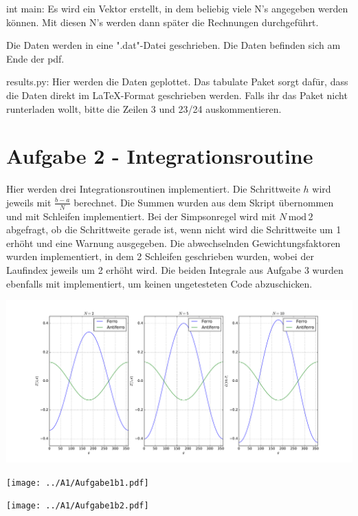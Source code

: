 int main:
Es wird ein Vektor erstellt, in dem beliebig viele N's angegeben werden können.
Mit diesen N's werden dann später die Rechnungen durchgeführt.

Die Daten werden in eine ".dat"-Datei geschrieben.
Die Daten befinden sich am Ende der pdf.

results.py:
Hier werden die Daten geplottet.
Das tabulate Paket sorgt dafür, dass die Daten direkt im LaTeX-Format geschrieben werden.
Falls ihr das Paket nicht runterladen wollt, bitte die Zeilen 3 und 23/24 auskommentieren.


\section{Aufgabe 2 - Integrationsroutine}
Hier werden drei Integrationsroutinen implementiert.
Die Schrittweite $h$ wird jeweils mit $\frac{b-a}{N}$ berechnet.
Die Summen wurden aus dem Skript übernommen und mit Schleifen implementiert.
Bei der Simpsonregel wird mit $N\,\text{mod}\,2$ abgefragt, ob die Schrittweite gerade ist, wenn nicht wird die Schrittweite um 1 erhöht und eine Warnung ausgegeben.
Die abwechselnden Gewichtungsfaktoren wurden implementiert, in dem 2 Schleifen geschrieben wurden, wobei der Laufindex jeweils um 2 erhöht wird.
Die beiden Integrale aus Aufgabe 3 wurden ebenfalls mit implementiert, um keinen ungetesteten Code abzuschicken.
\begin{landscape}
\thispagestyle{empty}
\hspace{-5cm}
\includegraphics[width=29cm]{../A1/Aufgabe1a.pdf}
\end{landscape}
\begin{landscape}
\thispagestyle{empty}
\hspace{-5cm}
\texttt{[image: ../A1/Aufgabe1b1.pdf]}
\end{landscape}
\begin{landscape}
\thispagestyle{empty}
\hspace{-5cm}
\texttt{[image: ../A1/Aufgabe1b2.pdf]}
\end{landscape}

